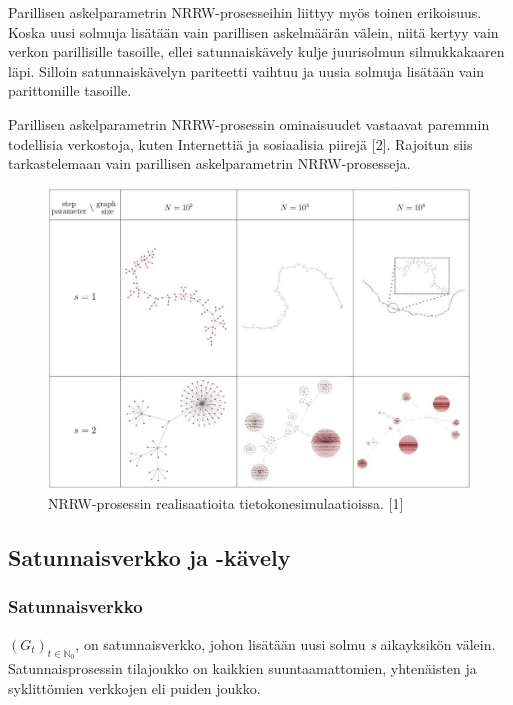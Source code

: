 \documentclass[finnish, 12pt, a4paper, sci, utf8, pdfa]{aaltothesis}
\newcommand{\N}{\mathbb{N}}
\begin{document}
Parillisen askelparametrin NRRW-prosesseihin liittyy myös toinen erikoisuus. Koska uusi solmuja lisätään vain parillisen askelmäärän välein, niitä kertyy vain verkon parillisille tasoille, ellei satunnaiskävely kulje juurisolmun silmukkakaaren läpi. Silloin satunnaiskävelyn pariteetti vaihtuu ja uusia solmuja lisätään vain parittomille tasoille.

Parillisen askelparametrin NRRW-prosessin ominaisuudet vastaavat paremmin todellisia verkostoja, kuten Internettiä ja sosiaalisia piirejä [2]. Rajoitun siis tarkastelemaan vain parillisen askelparametrin NRRW-prosesseja.

\begin{figure}[htb]
\centering
\includegraphics[width=.9\textwidth]{pictures/simulations.jpg}
\caption{NRRW-prosessin realisaatioita tietokonesimulaatioissa. [1] \label{simulaatiot}}
\end{figure}

\subsection{Satunnaisverkko ja -kävely}

\subsubsection{Satunnaisverkko}

\( (G_{t})_{t \in \N_{0}} \), on satunnaisverkko, johon lisätään uusi solmu \textit{s} aikayksikön välein. Satunnaisprosessin tilajoukko on kaikkien suuntaamattomien, yhtenäisten ja syklittömien verkkojen eli puiden joukko.

\vspace{0.5cm}
\end{document}
